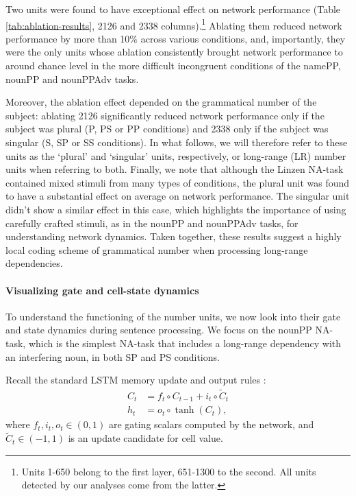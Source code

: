 Two units were found to have exceptional effect on network performance
(Table \ref{tab:ablation-results}, \unit{2}{126} and \unit{2}{338}
columns).\footnote{Units 1-650 belong to the first layer, 651-1300 to
  the second. All units detected by our analyses come from the latter.} Ablating them reduced network performance by more than 10\%
across various conditions, and, importantly, they were the only units
whose ablation consistently brought network performance to around
chance level in the more difficult incongruent conditions of the
namePP, nounPP and nounPPAdv
tasks. 

Moreover, the ablation effect depended on the grammatical number of the subject: ablating \unit{2}{126} significantly reduced
network performance only if the subject was plural (P, PS or PP conditions) and \unit{2}{338}
only if the subject was singular (S, SP or SS conditions). In what follows, we will therefore
refer to these units as the `plural' and `singular' units, respectively,
or long-range (LR) number units when referring to both. Finally, we note that although the Linzen NA-task contained mixed stimuli from many types of conditions, the plural unit was found to have a substantial effect on average on network performance. The singular unit didn't show a similar effect in this case, which highlights the importance of using carefully crafted stimuli, as in the nounPP and nounPPAdv tasks, for understanding network dynamics. Taken
together, these results suggest a highly local coding scheme of
grammatical number when processing long-range dependencies.

\paragraph{Visualizing gate and cell-state dynamics}\label{subsec:gate-dynamics}
To understand the functioning of the number units, we now look
into their gate and state dynamics during sentence processing. We
focus on the nounPP NA-task, which is the simplest NA-task that includes a
long-range dependency with an interfering noun, in both SP and PS
conditions.

Recall the standard LSTM memory update and output rules \cite{Hochreiter:Schmidhuber:1997}:
\begin{align} 
    C_t &= f_t\circ C_{t-1} + i_t\circ \widetilde{C}_t \label{eq:update-rule} \\
     h_t &= o_t\circ \tanh(C_t) \label{eq:output},
\end{align}
where $f_t, i_t, o_t \in (0,1)$ are gating scalars computed by the network, and $\widetilde{C}_t \in (-1, 1)$ is an update candidate for cell value.

